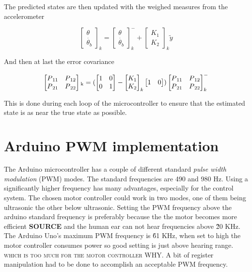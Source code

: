 \documentclass[a4paper,11pt]{kth-mag}
\begin{document}
The predicted states are then updated with the weighed measures from the accelerometer

\begin{equation}
\begin{bmatrix}
\theta \\
\dot{\theta_b}
\end{bmatrix}_k
=
\begin{bmatrix}
\theta \\
\dot{\theta_b}
\end{bmatrix}_k^-
+
\begin{bmatrix}
K_1 \\ K_2
\end{bmatrix}_k
\textbf{$\tilde{y}$}
\end{equation}

And then at last the error covariance

\begin{equation}
\begin{bmatrix}
P\textsubscript{11} & P\textsubscript{12} \\
P\textsubscript{21} & P\textsubscript{22}
\end{bmatrix}\textsubscript{k} 
=(
 \begin{bmatrix}
1 & 0 \\
0 & 1
\end{bmatrix}
-
\begin{bmatrix}
K_1 \\ K_2
\end{bmatrix}_k
\begin{bmatrix}
1 & 0
\end{bmatrix}
)
\begin{bmatrix}
P\textsubscript{11} & P\textsubscript{12} \\
P\textsubscript{21} & P\textsubscript{22}
\end{bmatrix}^-_k
\end{equation}


This is done during each loop of the microcontroller to ensure that the estimated state is as near the true state as possible.

\section{Arduino PWM implementation} \label{app: PWM}
The Arduino microcontroller has a couple of different standard \textit{pulse width modulation} (PWM) modes. The standard frequencies are 490 and 980 Hz. Using a significantly higher frequency has many advantages, especially for the control system. The chosen motor controller could work in two modes, one of them being ultrasonic the other below ultrasonic. Setting the PWM frequency above the arduino standard frequency is preferably because the the motor becomes more efficient \textbf{SOURCE} and the human ear can not hear frequencies above \~ 20 KHz. The Arduino Uno's maximum PWM frequency is \~ 61 KHz, when set to high the motor controller consumes power so good setting is just above hearing range.\textsc{ which is too much for the motor controller \textsc{WHY}}. A bit of register manipulation had to be 
done to accomplish an acceptable PWM frequency.
\end{document}
